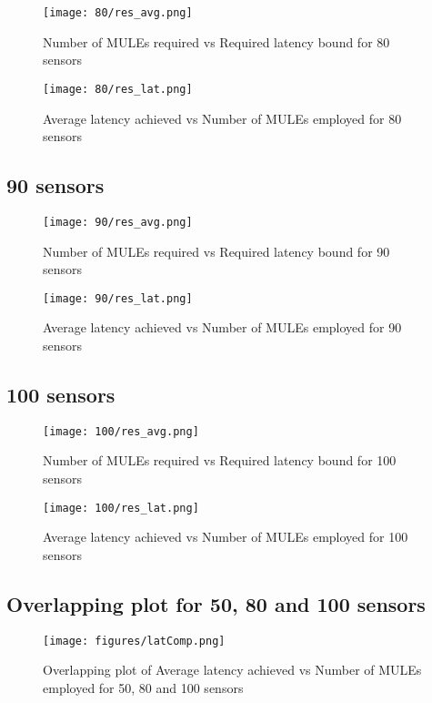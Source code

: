 \begin{figure}[H]
\texttt{[image: 80/res\_avg.png]}
\label{fig:avg80}
\caption{Number of MULEs required vs Required latency bound for 80 sensors}
\end{figure}
\begin{figure}[H]
\texttt{[image: 80/res\_lat.png]}
\label{fig:lat80}
\caption{Average latency achieved vs Number of MULEs employed for 80 sensors}
\end{figure}

\subsection{90 sensors}

\begin{figure}[H]
\texttt{[image: 90/res\_avg.png]}
\label{fig:avg90}
\caption{Number of MULEs required vs Required latency bound for 90 sensors}
\end{figure}
\begin{figure}[H]
\texttt{[image: 90/res\_lat.png]}
\label{fig:lat90}
\caption{Average latency achieved vs Number of MULEs employed for 90 sensors}
\end{figure}

\subsection{100 sensors}

\begin{figure}[H]
\texttt{[image: 100/res\_avg.png]}
\label{fig:avg100}
\caption{Number of MULEs required vs Required latency bound for 100 sensors}
\end{figure}
\begin{figure}[H]
\texttt{[image: 100/res\_lat.png]}
\label{fig:lat100}
\caption{Average latency achieved vs Number of MULEs employed for 100 sensors}
\end{figure}

\subsection{Overlapping plot for 50, 80 and 100 sensors}

\begin{figure}[H]
\texttt{[image: figures/latComp.png]}
\label{fig:latov}
\caption{Overlapping plot of Average latency achieved vs Number of MULEs employed for 50, 80 and 100 sensors}
\end{figure}

